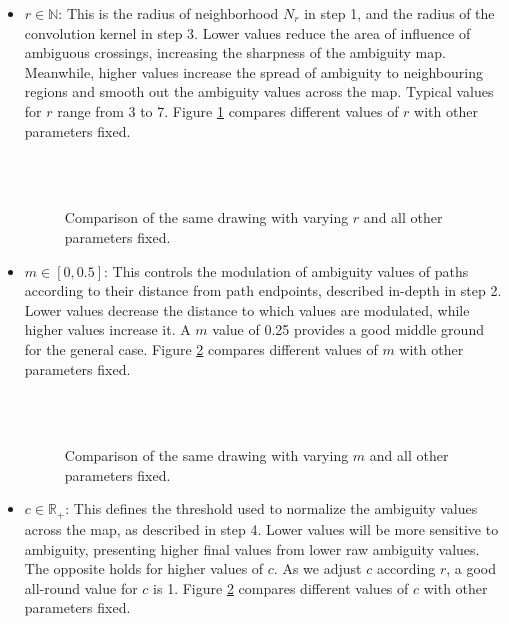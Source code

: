 \begin{itemize}
\item $r \in \mathbb{N}$: This is the radius of neighborhood $N_r$ in step 1, and the radius of the convolution kernel in step 3. Lower values reduce the area of influence of ambiguous crossings, increasing the sharpness of the ambiguity map. Meanwhile, higher values increase the spread of ambiguity to neighbouring regions and smooth out the ambiguity values across the map. Typical values for $r$ range from 3 to 7. Figure \ref{fig:param_r} compares different values of $r$ with other parameters fixed.

\begin{figure}[ht]
\centering
{}
\\
\\
\caption{Comparison of the same drawing with varying $r$ and all other parameters fixed.}
\label{fig:param_r}
\end{figure}

\item $m \in [0, 0.5]$: This controls the modulation of ambiguity values of paths according to their distance from path endpoints, described in-depth in step 2. Lower values decrease the distance to which values are modulated, while higher values increase it. A $m$ value of 0.25 provides a good middle ground for the general case. Figure \ref{fig:param_m} compares different values of $m$ with other parameters fixed.

\begin{figure}[ht]
\centering
{}
\\
\\
\caption{Comparison of the same drawing with varying $m$ and all other parameters fixed.}
\label{fig:param_m}
\end{figure}

\item $c \in \mathbb{R}_{+}$: This defines the threshold used to normalize the ambiguity values across the map, as described in step 4. Lower values will be more sensitive to ambiguity, presenting higher final values from lower raw ambiguity values. The opposite holds for higher values of $c$. As we adjust $c$ according $r$, a good all-round value for $c$ is 1. Figure \ref{fig:param_m} compares different values of $c$ with other parameters fixed.


\end{itemize}
